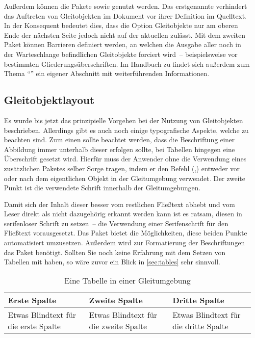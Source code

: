 \documentclass[%
  english,ngerman,%
  cdgeometry=no,DIV=12,automark,%
]{tudscrartcl}
\begin{document}
Außerdem können die Pakete  sowie  genutzt 
werden. Das erstgenannte verhindert das Auftreten von Gleitobjekten im Dokument 
vor ihrer Definition im Quelltext. In der Konsequent bedeutet dies, dass die 
Option  Gleitobjekte nur am oberen Ende der nächsten Seite 
jedoch nicht auf der aktuellen zulässt. Mit dem zweiten Paket können Barrieren 
definiert werden, an welchen die Ausgabe aller noch in der Warteschlange 
befindlichen Gleitobjekte forciert wird~-- beispielsweise vor bestimmten 
Gliederungsüberschriften. Im Handbuch zu \TUDScript findet sich außerdem zum 
Thema \enquote{} 
ein eigener Abschnitt mit weiterführenden Informationen.


\subsection{Gleitobjektlayout}
\label{sec:floatlayout}%
%
Es wurde bis jetzt das prinzipielle Vorgehen bei der Nutzung von Gleitobjekten 
beschrieben. Allerdings gibt es auch noch einige typografische Aspekte, welche 
zu beachten sind. Zum einen sollte beachtet werden, dass die Beschriftung einer 
Abbildung immer unterhalb dieser erfolgen sollte, bei Tabellen hingegen eine 
Überschrift gesetzt wird. Hierfür muss der Anwender ohne die Verwendung eines 
zusätzlichen Paketes selber Sorge tragen, indem er den Befehl 
(,) entweder vor oder 
nach dem eigentlichen Objekt in der Gleitumgebung verwendet. Der zweite Punkt 
ist die verwendete Schrift innerhalb der Gleitumgebungen. 

Damit sich der Inhalt dieser besser vom restlichen Fließtext abhebt und vom 
Leser direkt als nicht dazugehörig erkannt werden kann ist es ratsam, diesen in 
serifenloser Schrift zu setzen~-- die Verwendung einer Serifenschrift für den 
Fließtext vorausgesetzt. Das Paket  bietet die Möglichkeiten, 
diese beiden Punkte automatisiert umzusetzen. Außerdem wird zur Formatierung 
der Beschriftungen das Paket  benötigt. Sollten Sie noch keine 
Erfahrung mit dem Setzen von Tabellen mit  haben, so wäre zuvor 
ein Blick in \autoref{sec:tables} sehr sinnvoll. 

\newcommand*\tableexample[1][]{%
  \begin{tabularx}{.75\textwidth}{@{}XXX@{}}
  \toprule
  \textbf{Erste Spalte} & \textbf{Zweite Spalte} & 
  \textbf{Dritte Spalte} \tabularnewline
  \midrule
  Etwas Blindtext für die erste Spalte &
  Etwas Blindtext für die zweite Spalte &
  Etwas Blindtext für die dritte Spalte
  \tabularnewline
  \bottomrule
  \end{tabularx}
  #1%
}
\begin{table}
\tableexample[%
  \caption{Eine Tabelle in einer Gleitumgebung}\label{tab:tabular}%
]
\end{table}
\end{document}
